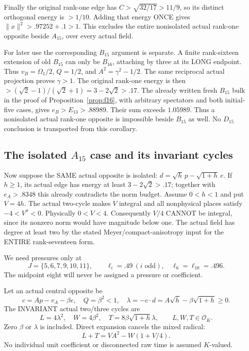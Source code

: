 Finally the original rank-one edge has
\(C>\sqrt{32/17}>11/9\), so its distinct orthogonal energy is
\(>1/10\).
Adding that energy ONCE gives
\(\|x\|^2>.97252+.1>1\).
This excludes the entire nonisolated actual rank-one opposite
beside \(A_{15}\), over every actual field.

For later use the corresponding \(B_{15}\) argument is separate.
A finite rank-sixteen extension of old \(B_{15}\) can only be
\(B_{16}\), attaching by three at its LONG endpoint.
Thus \(v_B=\Omega_1/2\), \(Q=1/2\), and
\(A^2=\gamma^2-1/2\).
The same reciprocal actual projection proves \(\gamma>1\).
The original rank-one energy is then
\(>(\sqrt2-1)/(\sqrt2+1)=3-2\sqrt2>.17\).
The already written fresh \(B_{15}\) bulk in the proof of
Proposition~\ref{prop:f16}, with arbitrary spectators and both
initial-five cases, gives \(e_B>E_{13}>.88989\).
Their sum exceeds \(1.05989\).
Thus a nonisolated actual rank-one opposite is impossible
beside \(B_{15}\) as well.  No \(D_{15}\) conclusion is
transported from this corollary.

\subsection{The isolated \(A_{15}\) case and its invariant cycles}
\label{app:arithA15isolatedcycles}

Now suppose the SAME actual opposite is isolated:
\(d=\sqrt h\,p-\sqrt{1+h}\,e\).
If \(h\ge1\), its actual edge has energy at least
\(3-2\sqrt2>.17\); together with \(e_A>.8348\) this
already contradicts the norm budget.
Assume \(0<h<1\) and put \(V=4h\).
The actual two-cycle makes \(V\) integral and all nonphysical
places satisfy \(-4<V^\sigma<0\).
Physically \(0<V<4\).
Consequently \(V/4\) CANNOT be integral, since its nonzero norm
would have magnitude below one.
The actual field has degree at least two by the stated
Meyer/compact-anisotropy input for the ENTIRE rank-seventeen form.

We need pressures only at
\[
 J=\{5,6,7,9,10,11\},\qquad
 \ell_i=.49\ (i\text{ odd}),\quad
 \ell_6=\ell_{10}=.496 .
\]
The midpoint eight will never be assigned a pressure or coefficient.

Let an actual central opposite be
\[
 c=Ap-v_A-\beta e,\quad Q=\beta^2<1,\quad
 \lambda=-c\cdot d=A\sqrt h-\beta\sqrt{1+h}\ge0.
\]
The INVARIANT actual two/three cycles are
\[
 L=4\lambda^2,\quad W=4\beta^2,\quad
T=8\beta\sqrt{1+h}\lambda,\qquad L,W,T\in\mathcal O_K .
\]
Zero \(\beta\) or \(\lambda\) is included.
Direct expansion cancels the mixed radical:
\[
                  L+T=VA^2-W(1+V/4).
\tag{Rankonecycle}\label{eq:arithrankonecycle}
\]
No individual unit coefficient or disconnected raw time is
assumed \(K\)-valued.

